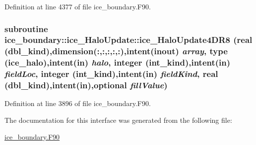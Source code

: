 Definition at line 4377 of file ice\_\-boundary.F90.\hypertarget{interfaceice__boundary_1_1ice__HaloUpdate_a34a986dcf143947fde5f9cc909e1a626}{
\subsubsection[{ice\_\-HaloUpdate4DR8}]{\setlength{\rightskip}{0pt plus 5cm}subroutine ice\_\-boundary::ice\_\-HaloUpdate::ice\_\-HaloUpdate4DR8 (real (dbl\_\-kind),dimension(:,:,:,:,:),intent(inout) {\em array}, \/  type ({\bf ice\_\-halo}),intent(in) {\em halo}, \/  integer (int\_\-kind),intent(in) {\em fieldLoc}, \/  integer (int\_\-kind),intent(in) {\em fieldKind}, \/  real (dbl\_\-kind),intent(in),optional {\em fillValue})}}
\label{interfaceice__boundary_1_1ice__HaloUpdate_a34a986dcf143947fde5f9cc909e1a626}


Definition at line 3896 of file ice\_\-boundary.F90.

The documentation for this interface was generated from the following file:\begin{DoxyCompactItemize}
\item 
\hyperlink{ice__boundary_8F90}{ice\_\-boundary.F90}\end{DoxyCompactItemize}
